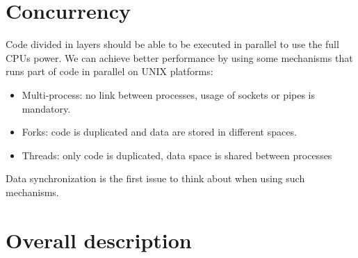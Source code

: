 \documentclass[a4paper,oneside]{report}
\begin{document}
\section{Concurrency}

Code divided in layers should be able to be executed in parallel to use the full
CPUs power. We can achieve better performance
by using some mechanisms that runs part of code in parallel on UNIX platforms:
\begin{itemize}
\item Multi-process: no link between processes, usage of sockets or pipes is mandatory.
\item Forks: code is duplicated and data are stored in different spaces.
\item Threads: only code is duplicated, data space is shared between processes
\end{itemize}
Data synchronization is the first issue to think about when using such mechanisms.

\section{Overall description}
\end{document}
